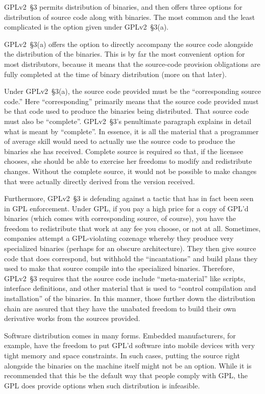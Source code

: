 GPLv2~\S3 permits distribution of binaries, and then offers three options for
distribution of source code along with binaries. The most common and the
least complicated is the option given under GPLv2~\S3(a).

GPLv2~\S3(a) offers the option to directly accompany the source code alongside
the distribution of the binaries.  This is by far the most convenient
option for most distributors, because it means that the source-code
provision obligations are fully completed at the time of binary
distribution (more on that later).

Under GPLv2~\S3(a), the source code provided must be the ``corresponding source
code.''  Here ``corresponding'' primarily means that the source code
provided must be that code used to produce the binaries being distributed.
That source code must also be ``complete''.   GPLv2~\S3's penultimate paragraph
explains in detail what is meant by ``complete''.  In essence, it is all
the material that a programmer of average skill would need to actually use
the source code to produce the binaries she has received.  Complete source
is required so that, if the licensee chooses, she should be able to
exercise her freedoms to modify and redistribute changes.  Without the
complete source, it would not be possible to make changes that were
actually directly derived from the version received.

Furthermore, GPLv2~\S3 is defending against a tactic that has in fact been
seen in GPL enforcement.  Under GPL, if you pay a high price for
a copy of GPL'd binaries (which comes with corresponding source, of
course), you have the freedom to redistribute that work at any fee you
choose, or not at all.  Sometimes, companies attempt a GPL-violating
cozenage whereby they produce very specialized binaries (perhaps for
an obscure architecture).  They then give source code that does
correspond, but withhold the ``incantations'' and build plans they
used to make that source compile into the specialized binaries.
Therefore, GPLv2~\S3 requires that the source code include ``meta-material'' like
scripts, interface definitions, and other material that is used to
``control compilation and installation'' of the binaries.  In this
manner, those further down the distribution chain are assured that
they have the unabated freedom to build their own derivative works
from the sources provided.

Software distribution comes in many
forms.  Embedded manufacturers, for example, have the freedom to put
GPL'd software into mobile devices with very tight memory and space
constraints.  In such cases, putting the source right alongside the
binaries on the machine itself might not be an option.  While it is
recommended that this be the default way that people comply with GPL, the
GPL does provide options when such distribution is infeasible.


